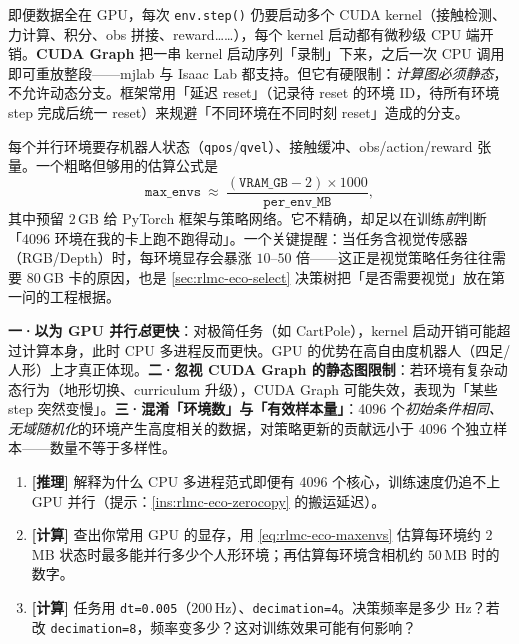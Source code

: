即便数据全在 GPU，每次 \verb|env.step()| 仍要启动多个 CUDA kernel（接触检测、力计算、积分、obs 拼接、reward……），每个 kernel 启动都有微秒级 CPU 端开销。\textbf{CUDA Graph} 把一串 kernel 启动序列「录制」下来，之后一次 CPU 调用即可重放整段——mjlab 与 Isaac Lab 都支持。但它有硬限制：\emph{计算图必须静态}，不允许动态分支。框架常用「延迟 reset」（记录待 reset 的环境 ID，待所有环境 step 完成后统一 reset）来规避「不同环境在不同时刻 reset」造成的分支。

\begin{insight}\label{ins:rlmc-eco-vram}
每个并行环境要存机器人状态（\verb|qpos|/\allowbreak\verb|qvel|）、接触缓冲、obs/action/reward 张量。一个粗略但够用的估算公式是
\begin{equation}
\texttt{max\_envs}\ \approx\ \frac{(\texttt{VRAM\_GB}-2)\times 1000}{\texttt{per\_env\_MB}},
\label{eq:rlmc-eco-maxenvs}
\end{equation}
其中预留 $2\,$GB 给 PyTorch 框架与策略网络。它不精确，却足以在训练\emph{前}判断「4096 环境在我的卡上跑不跑得动」。一个关键提醒：当任务含视觉传感器（RGB/Depth）时，每环境显存会暴涨 $10$--$50$ 倍——这正是视觉策略任务往往需要 $80\,$GB 卡的原因，也是 \cref{sec:rlmc-eco-select} 决策树把「是否需要视觉」放在第一问的工程根据。
\end{insight}

\begin{pitfall}
\textbf{一·以为 GPU 并行\emph{总}更快}：对极简任务（如 CartPole），kernel 启动开销可能超过计算本身，此时 CPU 多进程反而更快。GPU 的优势在高自由度机器人（四足/人形）上才真正体现。\textbf{二·忽视 CUDA Graph 的静态图限制}：若环境有复杂动态行为（地形切换、curriculum 升级），CUDA Graph 可能失效，表现为「某些 step 突然变慢」。\textbf{三·混淆「环境数」与「有效样本量」}：4096 个\emph{初始条件相同、无域随机化}的环境产生高度相关的数据，对策略更新的贡献远小于 4096 个独立样本——数量不等于多样性。
\end{pitfall}

\begin{practice}[练习·GPU 并行]
\begin{enumerate}
  \item \textbf{[推理]} 解释为什么 CPU 多进程范式即便有 4096 个核心，训练速度仍追不上 GPU 并行（提示：\cref{ins:rlmc-eco-zerocopy} 的搬运延迟）。
  \item \textbf{[计算]} 查出你常用 GPU 的显存，用 \cref{eq:rlmc-eco-maxenvs} 估算每环境约 $2\,$MB 状态时最多能并行多少个人形环境；再估算每环境含相机约 $50\,$MB 时的数字。
  \item \textbf{[计算]} 任务用 \verb|dt=0.005|（$200\,$Hz）、\verb|decimation=4|。决策频率是多少 Hz？若改 \verb|decimation=8|，频率变多少？这对训练效果可能有何影响？
\end{enumerate}
\end{practice}


